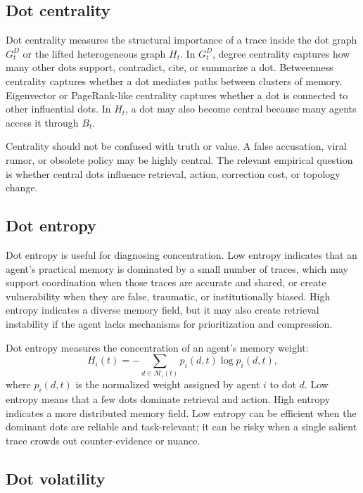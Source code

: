 \documentclass[11pt]{article}
\theoremstyle{remark}
\begin{document}
\subsection{Dot centrality}\label{dot-centrality}

Dot centrality measures the structural importance of a trace inside the dot graph $G^D_t$ or the lifted heterogeneous graph $H_t$. In $G^D_t$, degree centrality captures how many other dots support, contradict, cite, or summarize a dot. Betweenness centrality captures whether a dot mediates paths between clusters of memory. Eigenvector or PageRank-like centrality captures whether a dot is connected to other influential dots. In $H_t$, a dot may also become central because many agents access it through $B_t$.

Centrality should not be confused with truth or value. A false accusation, viral rumor, or obsolete policy may be highly central. The relevant empirical question is whether central dots influence retrieval, action, correction cost, or topology change.

\subsection{Dot entropy}\label{dot-entropy}

Dot entropy is useful for diagnosing concentration. Low entropy indicates that an agent's practical memory is dominated by a small number of traces, which may support coordination when those traces are accurate and shared, or create vulnerability when they are false, traumatic, or institutionally biased. High entropy indicates a diverse memory field, but it may also create retrieval instability if the agent lacks mechanisms for prioritization and compression.


Dot entropy measures the concentration of an agent's memory weight:
\[
H_i(t)=-\sum_{d\in \mathcal M_i(t)}p_i(d,t)\log p_i(d,t),
\]
where $p_i(d,t)$ is the normalized weight assigned by agent $i$ to dot $d$. Low entropy means that a few dots dominate retrieval and action. High entropy indicates a more distributed memory field. Low entropy can be efficient when the dominant dots are reliable and task-relevant; it can be risky when a single salient trace crowds out counter-evidence or nuance.

\subsection{Dot volatility}\label{dot-volatility}
\end{document}
